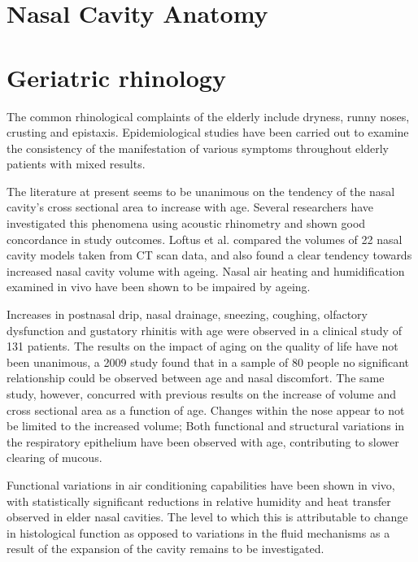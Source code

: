 \section{Nasal Cavity Anatomy}

\section{Geriatric rhinology}
The common rhinological complaints of the elderly include dryness, runny noses, crusting and epistaxis\cite{Varga-Huettner2013}. Epidemiological studies have been carried out to examine the consistency of the manifestation of various symptoms throughout elderly patients with mixed results. 

The literature at present seems to be unanimous on the tendency of the nasal cavity's cross sectional area to increase with age. Several researchers have investigated this phenomena using acoustic rhinometry and shown good concordance in study outcomes\cite{Kalmovich2005, Edelstein1996,WhanKim2007,Lindemann2008}. Loftus et al. \cite{Loftus2016} compared the volumes of 22 nasal cavity models taken from CT scan data, and also found a clear tendency towards increased nasal cavity volume with ageing. Nasal air heating and humidification examined in vivo have been shown to be impaired by ageing\cite{Lindemann2008}. 

Increases in postnasal drip, nasal drainage, sneezing, coughing, olfactory dysfunction and gustatory rhinitis with age were observed in a clinical study of 131 patients\cite{Edelstein1996}. The results on the impact of aging on the quality of life have not been unanimous, a 2009 study found that in a sample of 80 people no significant relationship could be observed between age and nasal discomfort\cite{Lindemann2010}. The same study, however, concurred with previous results on the increase of volume and cross sectional area as a function of age. Changes within the nose appear to not be limited to the increased volume; Both functional and structural variations in the respiratory epithelium have been observed with age, contributing to slower clearing of mucous\cite{HO2001}. 

Functional variations in air conditioning capabilities have been shown in vivo\cite{Lindemann2008}, with statistically significant reductions in relative humidity and heat transfer observed in elder nasal cavities. The level to which this is attributable to change in histological function as opposed to variations in the fluid mechanisms as a result of the expansion of the cavity remains to be investigated.

